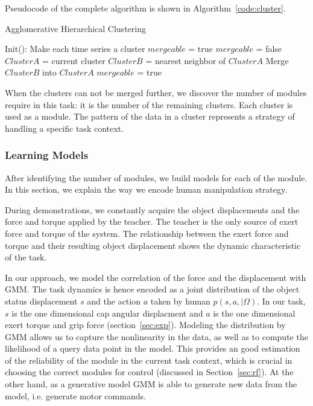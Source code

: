Pseudocode of the complete algorithm is shown in Algorithm~\ref{code:cluster}.

\begin{algorithm}
  \caption{Agglomerative Hierarchical Clustering}
  \begin{algorithmic}[1]
    \State Init(): Make each time series a cluster\;
    \State $mergeable$ = true\;
      \State $mergeable$ = false\;
        \State $ClusterA$ = current cluster\;
        \State $ClusterB$ = nearest neighbor of $ClusterA$\;
            \State Merge $ClusterB$ into $ClusterA$\;
            \State $mergeable$ = true\;
        \EndIf
      \EndFor
    \EndWhile
    \EndFunction
  \end{algorithmic}
  \label{code:cluster}
\end{algorithm}



When the clusters can not be merged further, we discover the number of modules require in this task: it is the number of the remaining clusters. Each cluster is used as a module. The pattern of the data in a cluster represents a strategy of handling a specific task context.

\subsubsection{Learning Models}
\label{sec:model}
After identifying the number of modules, we build models for each of the module. In this section, we explain the way we encode human manipulation strategy.

During demonstrations, we constantly acquire the object displacements and the force and torque applied by the teacher. The teacher is the only source of exert force and torque of the system. The relationship between the exert force and torque and their resulting object displacement shows the dynamic characteristic of the task.

In our approach, we model the correlation of the force and the displacement with GMM. The task dynamics is hence encoded as a joint distribution of the object status displacement $s$ and the action $a$ taken by human $p(s,a,{\mid}{\Omega})$. In our task, $s$ is the one dimensional cap angular displacment and $a$ is the one dimensional exert torque and grip force (section~\ref{sec:exp}).
Modeling the distribution by GMM allows us to capture the nonlinearity in the data, as well as to compute the likelihood of a query data point in the model. This provides an good estimation of the reliability of the module in the current task context, which is crucial in choosing the correct modules for control (discussed in Section~\ref{sec:rf}). At the other hand, as a generative model GMM is able to generate new data from the model, i.e. generate motor commands.

